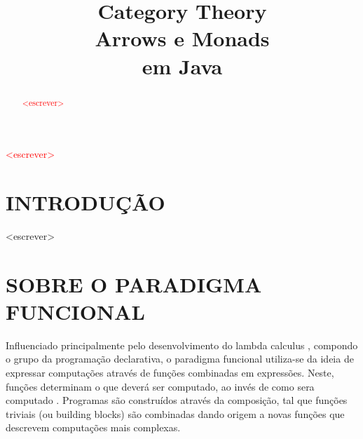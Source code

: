 \documentclass[10pt, conference]{IEEEtran}
\begin{document}
\title { 
	Category Theory \\
	Arrows e Monads \\
	em Java 
}

\author{


	\and	
	
}
					  
\maketitle

\begin{abstract}

\textcolor{red}{<escrever>}

\end{abstract}

\begin{IEEEkeywords}

\textcolor{red}{<escrever>}

\end{IEEEkeywords}

\section{INTRODUÇÃO}
\label{sec:intro}

<escrever>

\section{SOBRE O PARADIGMA FUNCIONAL}
\label{sec:func-para}
Influenciado principalmente pelo desenvolvimento do lambda calculus \cite{hudak1989conception}, compondo o grupo da programação declarativa, o paradigma funcional utiliza-se da ideia de expressar computações através de funções combinadas em expressões. Neste, funções determinam o que deverá ser computado, ao invés de como sera computado \cite{louden2011programming}. Programas são construídos através da composição, tal que funções triviais (ou building blocks) são combinadas dando origem a novas funções que descrevem computações mais complexas.
\end{document}
